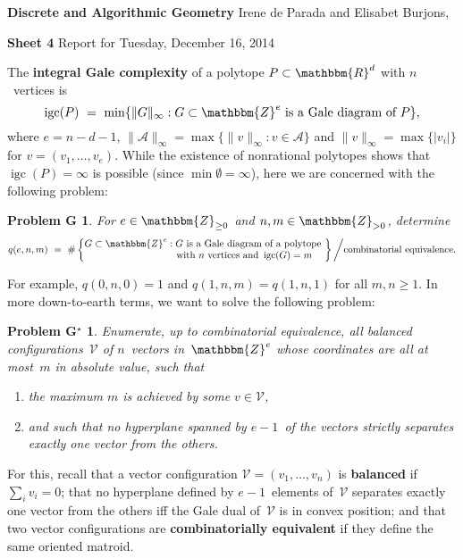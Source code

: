 \documentclass[11pt]{amsart}
\newcommand{\R}{\mathbbm{R}}
\newcommand{\Z}{\mathbbm{Z}}
\newcommand{\VV}{\mathcal{V}}
\DeclareMathOperator{\igc}{igc}
\newcommand{\defn}[1]{\textbf{\color{blue}#1}} %
\newtheorem*{problemG}{Problem G}
\newtheorem*{problemG*}{Problem G$^\star$}
\begin{document}
\begin{center}
\textbf{\sffamily
Discrete and Algorithmic Geometry }
\medskip
Irene de Parada and Elisabet Burjons,
\end{center}
\bigskip
\begin{center}
\textbf{\sffamily Sheet 4}
\bigskip
Report for Tuesday, December 16, 2014
\end{center}
\bigskip
\bigskip
The \defn{integral Gale complexity} of a polytope $P\subset\R^d$ with $n$~vertices is
\[
\igc(P)
\ = \
\min\{\|G\|_\infty : G \subset\Z^e \text{ is a Gale diagram of } P\},
\]
where $e=n-d-1$, $\|\mathcal A\|_\infty = \max\{\|v\|_\infty : v\in\mathcal A\}$ and $\|v\|_\infty = \max\{|v_i|\}$ for $v=(v_1,\dots,v_e)$.
While the existence of nonrational polytopes shows that $\igc(P)=\infty$ is possible (since $\min\emptyset=\infty$), here we are concerned with the following problem:
\begin{problemG}
For $e\in\Z_{\ge0}$ and $n, m\in\Z_{>0}$, determine
\[
q(e,n,m)
\ = \
\#\left\{
\begin{matrix}
G\subset\Z^e : G \text{ is a Gale diagram of a polytope } \\
\phantom{G\subset\Z^e}\!\!\text{with $n$ vertices and } \igc(G)=m
\end{matrix}
\right\} \bigg/ \text{combinatorial equivalence}.
\]
\end{problemG}
\noindent For example, $q(0,n,0) = 1$ and $q(1,n,m)=q(1,n,1)$ for all $m,n\ge1$. In more down-to-earth terms, we want to solve the following problem:
\begin{problemG*}
Enumerate, up to combinatorial equivalence, all balanced configurations~$\VV$ of $n$~vectors in~$\Z^e$ whose coordinates are all at most~$m$ in absolute value, such that
\begin{enumerate}
\item the maximum $m$ is achieved by some $v\in\VV$,
\item and such that no hyperplane spanned by $e-1$~of the vectors strictly separates exactly one vector from the others.
\end{enumerate}
\end{problemG*}
For this, recall
that a vector configuration $\VV = (v_1,\dots,v_n)$ is \defn{balanced} if $\sum_i v_i=0$;
that no hyperplane defined by $e-1$~elements of~$\VV$ separates exactly one vector from the others iff the Gale dual of~$\VV$ is in convex position;
and that two vector configurations are \defn{combinatorially equivalent} if they define the same oriented matroid.
\end{document}
